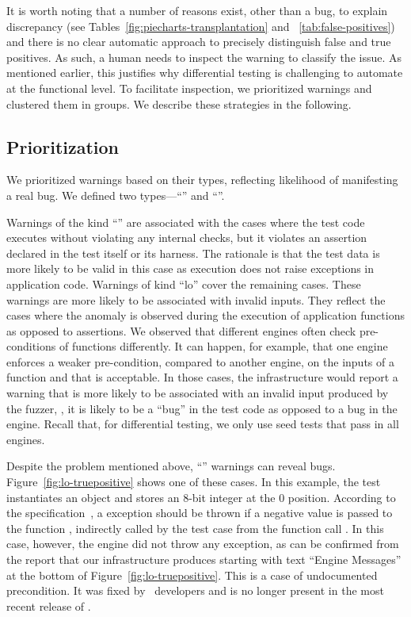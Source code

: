 \documentclass[sigconf,review, anonymous]{acmart}
\begin{document}
It is worth noting that a number of reasons exist, other than a bug,
to explain discrepancy (see Tables~\ref{fig:piecharts-transplantation}
and ~\ref{tab:false-positives}) and there is no clear automatic
approach to precisely distinguish false and true positives. As such, a
human needs to inspect the warning to classify the issue. As mentioned
earlier, this justifies why differential testing is challenging to
automate at the functional level. To facilitate inspection, we
prioritized warnings and clustered them in groups. We describe these
strategies in the following.

\subsection{Prioritization}

We prioritized warnings based on their types, reflecting likelihood of
manifesting a real bug. We defined two types---``\hi{}'' and
``\lo{}''.

Warnings of the kind ``\hi{}'' are associated with the cases where the
test code executes without violating any internal checks, but it
violates an assertion declared in the test itself or its harness. The
rationale is that the test data is more likely to be valid in this
case as execution does not raise exceptions in application
code. Warnings of kind ``lo'' cover the remaining cases. These
warnings are more likely to be associated with invalid inputs. They
reflect the cases where the anomaly is observed during the execution
of application functions as opposed to assertions. We observed that
different engines often check pre-conditions of functions
differently. It can happen, for example, that one engine enforces a
weaker pre-condition, compared to another engine, on the inputs of a
function and that is acceptable. In those cases,
the infrastructure would report a warning that is more likely to be
associated with an invalid input produced by the fuzzer, \ie{}, it is
likely to be a ``bug'' in the test code as opposed to a bug in the
engine. Recall that, for differential testing, we only use seed tests
that pass in all engines.

Despite the problem mentioned above, ``\lo'' warnings can reveal bugs.
Figure~\ref{fig:lo-truepositive} shows one of these cases. In this
example, the test instantiates an  object and
stores an 8-bit integer at the 0 position. According to the
specification~\cite{ecmas262-getviewvalue}, a 
exception should be thrown if a negative value is passed to the
function , indirectly called by the test case from the
function call . In this case, however, the \chakra{}
engine did not throw any exception, as can be confirmed from the
report that our infrastructure produces starting with text ``Engine
Messages'' at the bottom of Figure~\ref{fig:lo-truepositive}. This is
a case of undocumented precondition. It was fixed by
\chakra\ developers and is no longer present in the most recent
release of \chakra.
\end{document}
